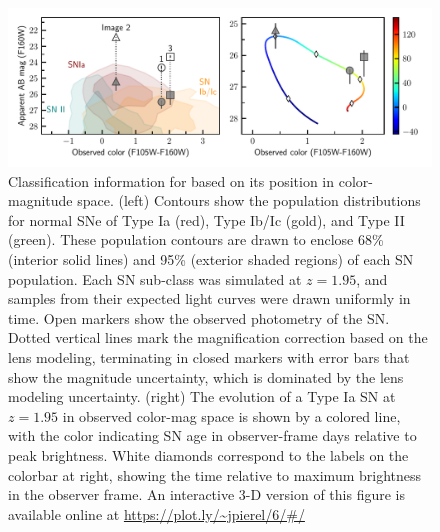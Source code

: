 \documentclass[fleqn,10pt]{wlscirep}
\begin{document}
\begin{figure}
    \centering
    \includegraphics[width=\textwidth]{Paper/Figures/classification_contours_timeline.pdf}
    \caption{Classification information for \SNABC based on its position in color-magnitude space. (left) Contours show the population distributions for normal SNe of Type Ia (red), Type Ib/Ic (gold), and Type II (green).  These population contours are drawn to enclose 68\% (interior solid lines) and 95\% (exterior shaded regions) of each SN population.  Each SN sub-class was simulated at $z=1.95$, and samples from their expected light curves were drawn uniformly in time. Open markers show the observed photometry of the SN. Dotted vertical lines mark the magnification correction based on the lens modeling, terminating in closed markers with error bars that show the magnitude uncertainty, which is dominated by the lens modeling uncertainty.  (right) The evolution of a Type Ia SN at $z=1.95$ in observed color-mag space is shown by a colored line, with the color indicating SN age in observer-frame days relative to peak brightness.  White diamonds correspond to the labels on the colorbar at right, showing the time relative to maximum brightness in the observer frame. An interactive 3-D version of this figure is available online at \url{https://plot.ly/~jpierel/6/#/}
    }
    \label{fig:colormag}
\end{figure}


\end{document}
